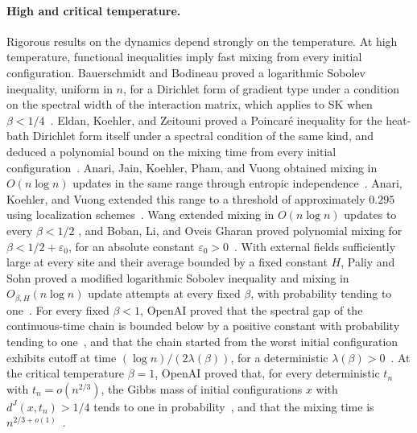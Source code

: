 \paragraph{High and critical temperature.}
Rigorous results on the dynamics depend strongly on the temperature. At high
temperature, functional inequalities imply fast mixing from every initial
configuration. Bauerschmidt and Bodineau proved a logarithmic Sobolev
inequality, uniform in $n$, for a Dirichlet form of gradient type under a
condition on the spectral width of the interaction matrix, which applies to
SK when $\beta<1/4$~\cite[Theorem~1 and Corollary~2]{bauerschmidt-bodineau-2019}.
Eldan, Koehler, and Zeitouni proved a Poincar\'e inequality for the
heat-bath Dirichlet form itself under a spectral condition of the same kind,
and deduced a polynomial bound on the mixing time from every initial
configuration~\cite[Theorems~1 and~11]{eldan-koehler-zeitouni-2022}. Anari,
Jain, Koehler, Pham, and Vuong obtained mixing in $O(n\log n)$ updates in the
same range through entropic
independence~\cite[Theorem~12]{anari-jain-koehler-pham-vuong-2022}.
Anari, Koehler, and Vuong extended this range to a threshold of approximately
$0.295$ using localization schemes~\cite[Theorem~1 and Section~1.3]{anari-koehler-vuong-2024}. Wang
extended mixing in $O(n\log n)$ updates to every $\beta<1/2$
\cite[Theorem~1.1]{wang-2026}, and Boban, Li, and Oveis Gharan proved
polynomial mixing for $\beta<1/2+\varepsilon_0$, for an absolute constant
$\varepsilon_0>0$~\cite[Theorem~1.5 and Corollary~1.6]{boban-li-oveis-gharan-2026}.
With external fields sufficiently large at every site and their average
bounded by a fixed constant $H$, Paliy and Sohn proved a modified
logarithmic Sobolev inequality and mixing in $O_{\beta,H}(n\log n)$ update
attempts at every fixed $\beta$, with probability tending to
one~\cite[Corollary~1.5]{paliy-sohn-2026}.
For every fixed $\beta<1$, OpenAI proved that the spectral gap of the
continuous-time chain is bounded below by a positive constant with
probability tending to one~\cite[Theorem~1.1]{oai-spectral-gap}, and that
the chain started from the worst initial configuration exhibits cutoff at
time $(\log n)/(2\lambda(\beta))$, for a deterministic
$\lambda(\beta)>0$~\cite[Theorem~1.1]{oai-cutoff}. At the critical
temperature $\beta=1$, OpenAI proved that, for every deterministic $t_n$
with $t_n=o(n^{2/3})$, the Gibbs mass of initial configurations $x$ with
$d^J(x,t_n)>1/4$ tends to one in probability~\cite[Theorem~1.1]{oai-critical-slowing},
and that the mixing time is $n^{2/3+o(1)}$~\cite[Theorem~1.1]{oai-critical-mixing}.

